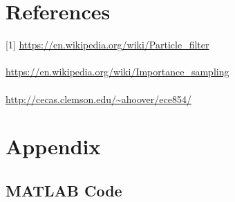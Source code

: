\documentclass[12pt]{article}
\begin{document}
\section*{References}
[1] \url{https://en.wikipedia.org/wiki/Particle_filter} \\
\\ \noindent
[2] \url{https://en.wikipedia.org/wiki/Importance_sampling} \\
\\ \noindent
[3] \url{http://cecas.clemson.edu/~ahoover/ece854/}
\section*{Appendix}

\subsection*{MATLAB Code}

\end{document}
